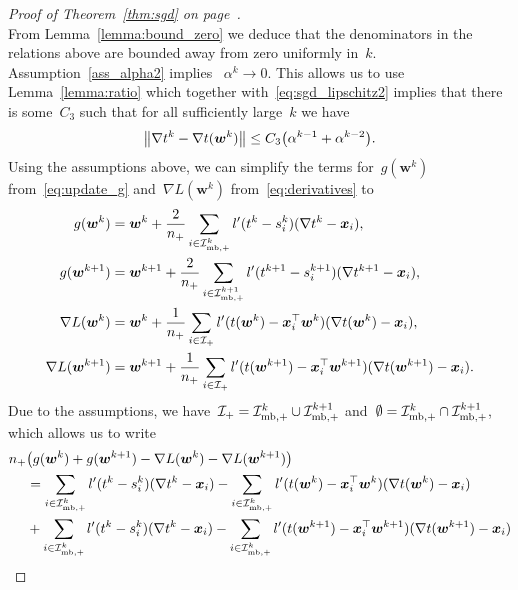 \begin{proof}[Proof of Theorem~\ref{thm:sgd} on page~\pageref{thm:sgd}]
\begin{equation*}
  \end{equation*}
  From Lemma~\ref{lemma:bound_zero} we deduce that the denominators in the relations above are bounded away from zero uniformly in~$k$. Assumption~\ref{ass_alpha2} implies ~$\alpha^k \to 0$. This allows us to use Lemma~\ref{lemma:ratio} which together with~\eqref{eq:sgd_lipschitz2} implies that there is some~$C_3$ such that for all sufficiently large~$k$ we have
  \begin{equation}\label{eq:sgd_nablat_diff}
    \norm{\nabla t^k - \nabla t(\bm{w}^k)} \leq C_3\Brac{\alpha^{k-1} + \alpha^{k-2}}.
  \end{equation}
  Using the assumptions above, we can simplify the terms for~$g(\bm{w}^k)$ from~\eqref{eq:update_g} and~$\nabla L(\bm{w}^k)$ from~\eqref{eq:derivatives} to
  \begin{equation*}
    \begin{aligned}
      g(\bm{w}^k)
        & = \bm{w}^{k} + \frac{2}{n_{+}} \sum_{i \in \mathcal{I}_{\text{mb},+}^k} l'(t^k - s_i^k)(\nabla t^k - \bm{x}_i), \\
      g(\bm{w}^{k+1})
        & = \bm{w}^{k+1} + \frac{2}{n_{+}} \sum_{i \in \mathcal{I}_{\text{mb},+}^{k+1}} l'(t^{k+1}-s_i^{k+1})(\nabla t^{k+1} - \bm{x}_i), \\
      \nabla L(\bm{w}^k)
        & = \bm{w}^{k} + \frac{1}{n_{+}} \sum_{i \in \mathcal{I}_{+}} l'(t(\bm{w}^k) - \bm{x}_i^\top \bm{w}^k)(\nabla t(\bm{w}^k) - \bm{x}_i), \\
      \nabla L(\bm{w}^{k+1})
        & = \bm{w}^{k+1} + \frac{1}{n_{+}} \sum_{i \in \mathcal{I}_{+}} l'(t(\bm{w}^{k+1}) - \bm{x}_i^\top \bm{w}^{k+1})(\nabla t(\bm{w}^{k+1}) - \bm{x}_i).
    \end{aligned}
  \end{equation*}
  Due to the assumptions, we have~$\mathcal{I}_{+} = \mathcal{I}_{\text{mb},+}^k \cup \mathcal{I}_{\text{mb},+}^{k+1}$ and~$\emptyset = \mathcal{I}_{\text{mb},+}^k \cap \mathcal{I}_{\text{mb},+}^{k+1}$, which allows us to write
  \begin{subequations}\label{eq:sgd_sum}
    \begin{align}
    \label{eq:sgd_sum1}
    \npos & \Brac{g(\bm{w}^k) + g(\bm{w}^{k+1}) - \nabla L(\bm{w}^k)-\nabla L(\bm{w}^{k+1})}\\
    \label{eq:sgd_sum2}
    & = \sum_{i \in \Imbpos^k} l'(t^k - s_i^k)(\nabla t^k - \bm{x}_i) - \sum_{i \in \Imbpos^k} l'(t(\bm{w}^k) - \bm{x}_i^\top \bm{w}^k)(\nabla t(\bm{w}^k) - \bm{x}_i) \\
    \label{eq:sgd_sum3}
    & + \sum_{i \in \Imbpos^k} l'(t^k - s_i^k)(\nabla t^k - \bm{x}_i) - \sum_{i \in \Imbpos^k} l'(t(\bm{w}^{k+1}) - \bm{x}_i^\top \bm{w}^{k+1})(\nabla t(\bm{w}^{k+1}) - \bm{x}_i)\\

\end{align}
\end{subequations}
\end{proof}
